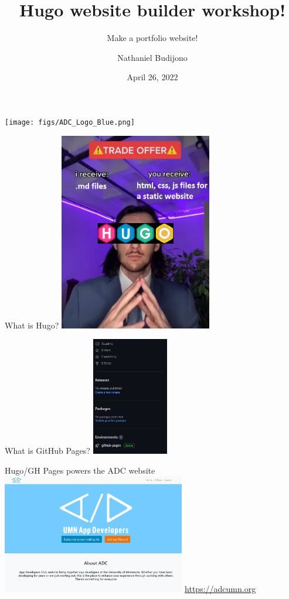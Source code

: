 \documentclass{beamer}
\title{Hugo website builder workshop!}
\subtitle{Make a portfolio website!}
\author{Nathaniel Budijono}
\date{April 26, 2022}
\institute{UMN ADC}
\begin{document}
\begin{frame}
    \titlepage
    \texttt{[image: figs/ADC\_Logo\_Blue.png]}
\end{frame}

\begin{frame}{What is Hugo?}
	\centering
	\includegraphics[width=0.5\textwidth]{figs/hugo.png}
\end{frame}

\begin{frame}{What is GitHub Pages?}
	\centering
	\includegraphics[width=0.25\textwidth]{figs/gh-pages.png}
\end{frame}

\begin{frame}{Hugo/GH Pages powers the ADC website}
	\centering
	\includegraphics[width=0.6\textwidth]{figs/adc-website.png}
	\bigbreak
	\href{https://adcumn.org}{https://adcumn.org}
\end{frame}
\end{document}
